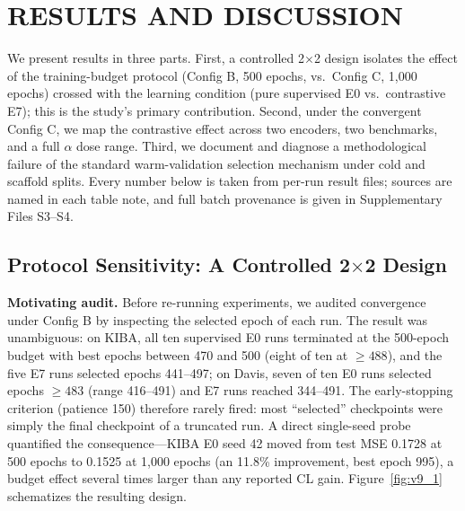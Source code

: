 \documentclass[10pt,a4paper,twocolumn]{article}
\begin{document}
\section{RESULTS AND DISCUSSION}

We present results in three parts. First, a controlled 2$\times$2 design isolates the effect of the training-budget protocol (Config B, 500 epochs, vs.\ Config C, 1{,}000 epochs) crossed with the learning condition (pure supervised E0 vs.\ contrastive E7); this is the study's primary contribution. Second, under the convergent Config C, we map the contrastive effect across two encoders, two benchmarks, and a full $\alpha$ dose range. Third, we document and diagnose a methodological failure of the standard warm-validation selection mechanism under cold and scaffold splits. Every number below is taken from per-run result files; sources are named in each table note, and full batch provenance is given in Supplementary Files S3--S4.

\subsection{Protocol Sensitivity: A Controlled 2$\times$2 Design}

\textbf{Motivating audit.} Before re-running experiments, we audited convergence under Config B by inspecting the selected epoch of each run. The result was unambiguous: on KIBA, all ten supervised E0 runs terminated at the 500-epoch budget with best epochs between 470 and 500 (eight of ten at $\geq 488$), and the five E7 runs selected epochs 441--497; on Davis, seven of ten E0 runs selected epochs $\geq 483$ (range 416--491) and E7 runs reached 344--491. The early-stopping criterion (patience 150) therefore rarely fired: most ``selected'' checkpoints were simply the final checkpoint of a truncated run. A direct single-seed probe quantified the consequence---KIBA E0 seed 42 moved from test MSE 0.1728 at 500 epochs to 0.1525 at 1{,}000 epochs (an 11.8\% improvement, best epoch 995), a budget effect several times larger than any reported CL gain. Figure~\ref{fig:v9_1} schematizes the resulting design.
\end{document}
